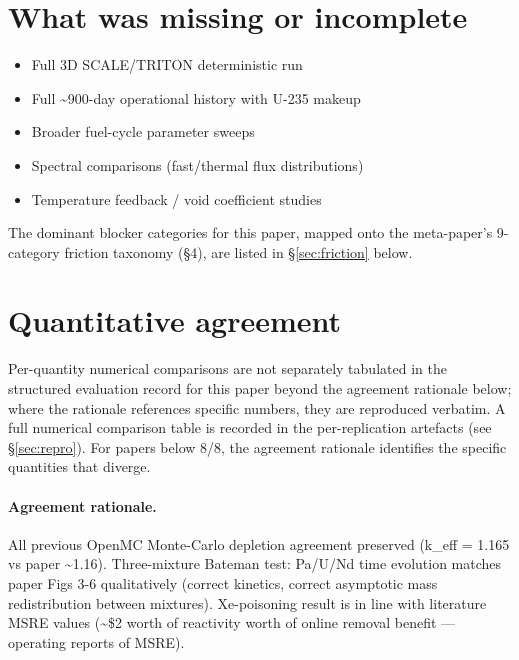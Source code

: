 \documentclass[11pt]{article}
\begin{document}
\section{What was missing or incomplete}
\begin{itemize}
\item Full 3D SCALE/TRITON deterministic run
\item Full \textasciitilde{}900-day operational history with U-235 makeup
\item Broader fuel-cycle parameter sweeps
\item Spectral comparisons (fast/thermal flux distributions)
\item Temperature feedback / void coefficient studies
\end{itemize}
The dominant blocker categories for this paper, mapped onto the meta-paper's 9-category friction taxonomy (\S4), are listed in \S\ref{sec:friction} below.

\section{Quantitative agreement}
Per-quantity numerical comparisons are not separately tabulated in the structured evaluation record for this paper beyond the agreement rationale below; where the rationale references specific numbers, they are reproduced verbatim. A full numerical comparison table is recorded in the per-replication artefacts (see \S\ref{sec:repro}). For papers below 8/8, the agreement rationale identifies the specific quantities that diverge.

\paragraph{Agreement rationale.} All previous OpenMC Monte-Carlo depletion agreement preserved (k\_eff = 1.165 vs paper \textasciitilde{}1.16). Three-mixture Bateman test: Pa/U/Nd time evolution matches paper Figs 3-6 qualitatively (correct kinetics, correct asymptotic mass redistribution between mixtures). Xe-poisoning result is in line with literature MSRE values (\textasciitilde{}\$2 worth of reactivity worth of online removal benefit — operating reports of MSRE).
\end{document}
